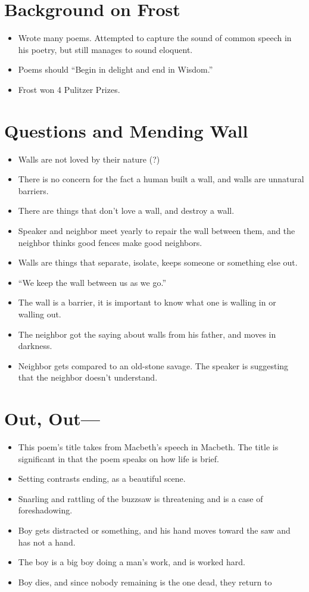 \documentclass[10pt]{article}
\begin{document}
\section{Background on Frost}
\begin{itemize}
	\item Wrote many poems.  Attempted to capture the sound of common speech in 
		his poetry, but still manages to sound eloquent.
	\item Poems should ``Begin in delight and end in Wisdom.''
	\item Frost won 4 Pulitzer Prizes.
\end{itemize}
\section{Questions and Mending Wall}
\begin{itemize}
	\item Walls are not loved by their nature (?)
	\item There is no concern for the fact a human built a wall, and walls are
		unnatural barriers.
	\item There are things that don't love a wall, and destroy a wall.
	\item Speaker and neighbor meet yearly to repair the wall between them, and 
		the neighbor thinks good fences make good neighbors.
	\item Walls are things that separate, isolate, keeps someone or something 
		else out.
	\item ``We keep the wall between us as we go.''
	\item The wall is a barrier, it is important to know what one is walling in
		or walling out.
	\item The neighbor got the saying about walls from his father, and moves in 
		darkness.
	\item Neighbor gets compared to an old-stone savage.  The speaker is
		suggesting that the neighbor doesn't understand.
\end{itemize}

\section{Out, Out---}
\begin{itemize}
	\item This poem's title takes from Macbeth's speech in Macbeth.  The title is
		significant in that the poem speaks on how life is brief.  
	\item Setting contrasts ending, as a beautiful scene.
	\item Snarling and rattling of the buzzsaw is threatening and is a case of
		foreshadowing.
	\item Boy gets distracted or something, and his hand moves toward the saw and
		has not a hand.
	\item The boy is a big boy doing a man's work, and is worked hard.
	\item Boy dies, and since nobody remaining is the one dead, they return to 
\end{itemize}
\end{document}
